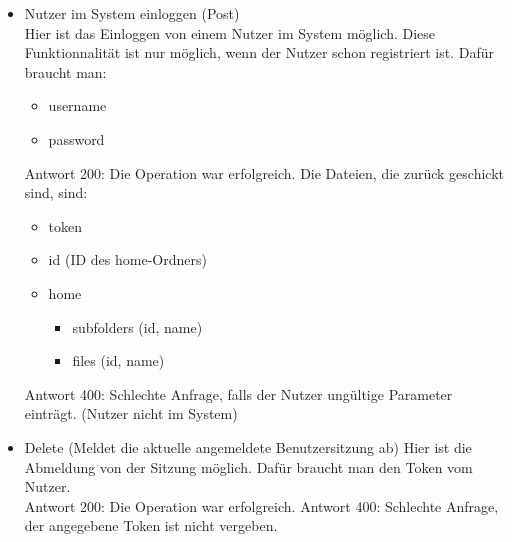 \begin{enumerate}
\begin{itemize}
\item Nutzer im System einloggen (Post) \\
Hier ist das Einloggen von einem Nutzer im System m\"oglich. Diese Funktionnalit\"at ist nur m\"oglich, wenn der Nutzer schon registriert ist. Daf\"ur braucht man: 
\begin{itemize}
\item username 
\item password
\end{itemize}
Antwort 200: Die Operation war erfolgreich. Die Dateien, die zur\"uck geschickt sind, sind:
\begin{itemize}
\item token
\item id (ID des home-Ordners)
\item home
	\begin{itemize}
	\item subfolders (id, name)
	\item files (id, name)
	\end{itemize}
\end{itemize}
Antwort 400: Schlechte Anfrage, falls der Nutzer ung\"ultige Parameter eintr\"agt. (Nutzer nicht im System)
\item Delete (Meldet die aktuelle angemeldete Benutzersitzung ab)
Hier ist die Abmeldung von der Sitzung m\"oglich. Daf\"ur braucht man den Token vom Nutzer. \\
Antwort 200: Die Operation war erfolgreich. 
Antwort 400: Schlechte Anfrage, der angegebene Token ist nicht vergeben.
\end{itemize}


\end{enumerate}
